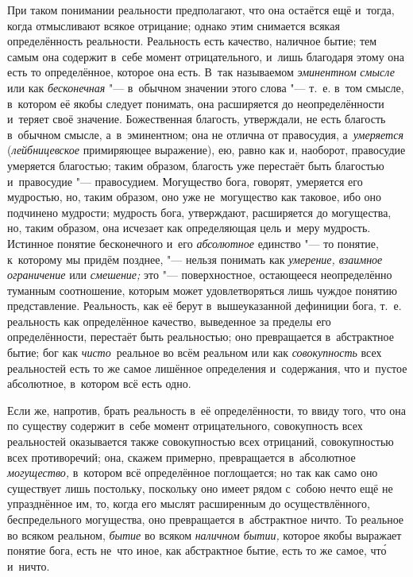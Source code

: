 \label{bkm:bm73b}При таком понимании реальности предполагают, что она
остаётся ещё и~тогда, когда отмысливают всякое отрицание; однако этим снимается
всякая определённость реальности. Реальность есть качество, наличное бытие; тем
самым она содержит в~себе момент отрицательного, и~лишь благодаря этому она
есть то определённое, которое она есть. В~так называемом
{\em эминентном} {\em смысле} или как {\em бесконечная} "--- в~обычном значении
этого слова "--- т.~е. в~том смысле, в~котором её якобы следует понимать, она
расширяется до неопределённости и~теряет своё значение. Божественная благость,
утверждали, не есть благость в~обычном смысле, а~в~эминентном; она не отлична
от правосудия, а~{\em умеряется} ({\em лейбницевское} примиряющее выражение),
ею, равно как и, наоборот, правосудие умеряется благостью; таким образом,
благость уже перестаёт быть благостью и~правосудие "--- правосудием. Могущество
бога, говорят, умеряется его мудростью, но, таким образом, оно уже
не~могущество как таковое, ибо оно подчинено мудрости; мудрость бога,
утверждают, расширяется до могущества, но, таким образом, она исчезает как
определяющая цель и~меру мудрость. Истинное понятие бесконечного и~его
{\em абсолютное} единство "--- то понятие, к~которому мы придём позднее, "---
нельзя понимать как {\em умерение, взаимное ограничение} или {\em смешение;}
это "--- поверхностное, остающееся неопределённо туманным соотношение, которым
может удовлетворяться лишь чуждое понятию представление. Реальность, как её
берут в~вышеуказанной дефиниции бога, т.~е. реальность как определённое
качество, выведенное за пределы его определённости, перестаёт быть реальностью;
оно превращается в~абстрактное бытие; бог как {\em чисто}~реальное во всём
реальном или как {\em совокупность} всех реальностей есть то же самое лишённое
определения и~содержания, что и~пустое абсолютное, в~котором всё есть одно.

Если же, напротив, брать реальность в~её определённости, то ввиду того, что
она по существу содержит в~себе момент отрицательного, совокупность всех
реальностей оказывается также совокупностью всех отрицаний, совокупностью всех
противоречий; она, скажем примерно, превращается в~абсолютное {\em могущество,}
в~котором всё определённое поглощается; но так как само оно существует лишь
постольку, поскольку оно имеет рядом с~собою нечто ещё не упразднённое им, то,
когда его мыслят расширенным до осуществлённого, беспредельного могущества, оно
превращается в~абстрактное ничто. То реальное во всяком реальном, {\em бытие}
во всяком {\em наличном бытии,} которое якобы выражает понятие бога, есть
не~что иное, как абстрактное бытие, есть то же самое, чт\'{о} и~ничто.

